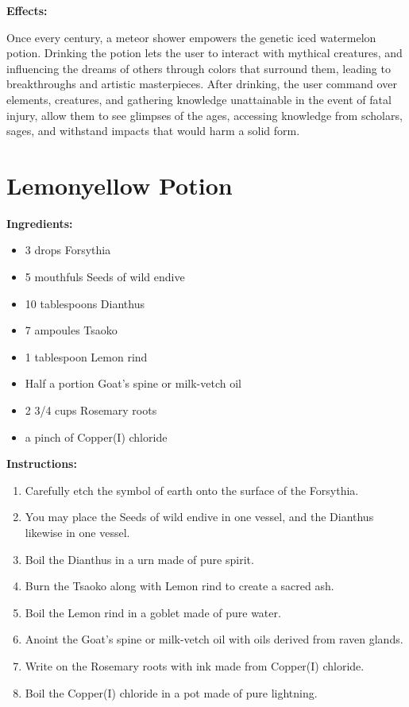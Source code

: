 \documentclass{article}
\begin{document}
\textbf{Effects:}

Once every century, a meteor shower empowers the genetic iced watermelon potion. Drinking the potion lets the user to interact with mythical creatures, and influencing the dreams of others through colors that surround them, leading to breakthroughs and artistic masterpieces. After drinking, the user command over elements, creatures, and gathering knowledge unattainable in the event of fatal injury, allow them to see glimpses of the ages, accessing knowledge from scholars, sages, and withstand impacts that would harm a solid form.

\newpage
\section*{Lemonyellow Potion}

\textbf{Ingredients:}

\begin{itemize}
  \item 3 drops Forsythia
  \item 5 mouthfuls Seeds of wild endive
  \item 10 tablespoons Dianthus
  \item 7 ampoules Tsaoko
  \item 1 tablespoon Lemon rind
  \item Half a portion Goat's spine or milk-vetch oil
  \item 2 3/4 cups Rosemary roots
  \item a pinch of Copper(I) chloride
\end{itemize}

\textbf{Instructions:}

\begin{enumerate}
  \item Carefully etch the symbol of earth onto the surface of the Forsythia.
  \item You may place the Seeds of wild endive in one vessel, and the Dianthus likewise in one vessel.
  \item Boil the Dianthus in a urn made of pure spirit.
  \item Burn the Tsaoko along with Lemon rind to create a sacred ash.
  \item Boil the Lemon rind in a goblet made of pure water.
  \item Anoint the Goat's spine or milk-vetch oil with oils derived from raven glands.
  \item Write on the Rosemary roots with ink made from Copper(I) chloride.
  \item Boil the Copper(I) chloride in a pot made of pure lightning.
\end{enumerate}
\end{document}
